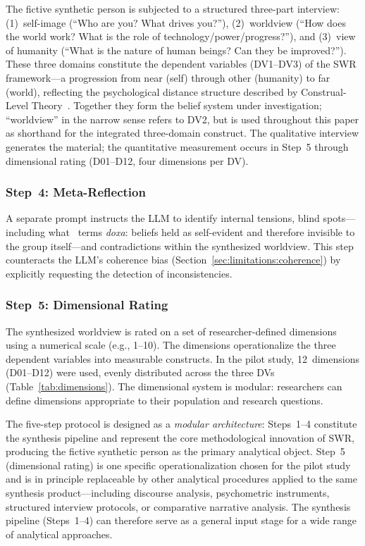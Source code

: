 \documentclass[11pt,a4paper]{article}
\begin{document}
The fictive synthetic person is subjected to a structured three-part interview: (1)~self-image (``Who are you? What drives you?''), (2)~worldview (``How does the world work? What is the role of technology/power/progress?''), and (3)~view of humanity (``What is the nature of human beings? Can they be improved?''). These three domains constitute the dependent variables (DV1--DV3) of the SWR framework---a progression from near (self) through other (humanity) to far (world), reflecting the psychological distance structure described by Construal-Level Theory~\citep{TropeLiberman2010}. Together they form the belief system under investigation; ``worldview'' in the narrow sense refers to DV2, but is used throughout this paper as shorthand for the integrated three-domain construct. The qualitative interview generates the material; the quantitative measurement occurs in Step~5 through dimensional rating (D01--D12, four dimensions per DV).

\subsubsection{Step~4: Meta-Reflection}

A separate prompt instructs the LLM to identify internal tensions, blind spots---including what~\citet{Bourdieu1977} terms \emph{doxa}: beliefs held as self-evident and therefore invisible to the group itself---and contradictions within the synthesized worldview. This step counteracts the LLM's coherence bias (Section~\ref{sec:limitations:coherence}) by explicitly requesting the detection of inconsistencies.

\subsubsection{Step~5: Dimensional Rating}

The synthesized worldview is rated on a set of researcher-defined dimensions using a numerical scale (e.g., 1--10). The dimensions operationalize the three dependent variables into measurable constructs. In the pilot study, 12~dimensions (D01--D12) were used, evenly distributed across the three DVs (Table~\ref{tab:dimensions}). The dimensional system is modular: researchers can define dimensions appropriate to their population and research questions.

The five-step protocol is designed as a \emph{modular architecture}: Steps~1--4 constitute the synthesis pipeline and represent the core methodological innovation of SWR, producing the fictive synthetic person as the primary analytical object. Step~5 (dimensional rating) is one specific operationalization chosen for the pilot study and is in principle replaceable by other analytical procedures applied to the same synthesis product---including discourse analysis, psychometric instruments, structured interview protocols, or comparative narrative analysis. The synthesis pipeline (Steps~1--4) can therefore serve as a general input stage for a wide range of analytical approaches.
\end{document}
